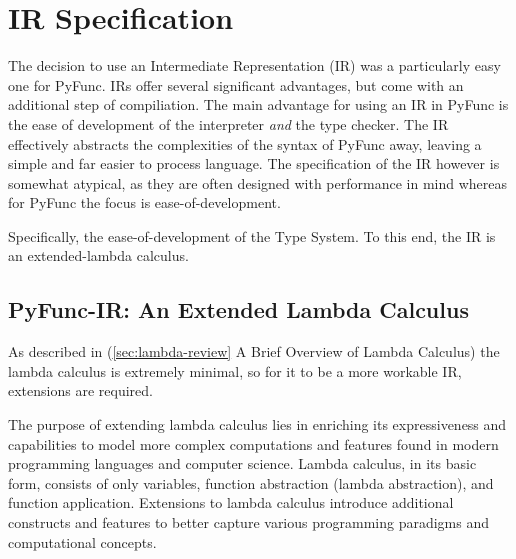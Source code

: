 \documentclass{l4proj}
\begin{document}
\section{IR Specification}
The decision to use an Intermediate Representation (IR) was a particularly easy one for PyFunc.
IRs offer several significant advantages, but come with an additional step of compiliation.
The main advantage for using an IR in PyFunc is the ease of development of the interpreter \emph{and} the type checker.
The IR effectively abstracts the complexities of the syntax of PyFunc away, leaving a simple and far easier to process language.
The specification of the IR however is somewhat atypical, as they are often designed with performance in mind whereas for PyFunc the focus is ease-of-development.

Specifically, the ease-of-development of the Type System.
To this end, the IR is an extended-lambda calculus.

\subsection{PyFunc-IR: An Extended Lambda Calculus}
As described in (\ref{sec:lambda-review} A Brief Overview of Lambda Calculus) the lambda calculus is extremely minimal, so for it to be a more workable IR, extensions are required.

The purpose of extending lambda calculus lies in enriching its expressiveness and capabilities to model more complex computations and features found in modern programming languages and computer science.
Lambda calculus, in its basic form, consists of only variables, function abstraction (lambda abstraction), and function application.
Extensions to lambda calculus introduce additional constructs and features to better capture various programming paradigms and computational concepts.
\end{document}
